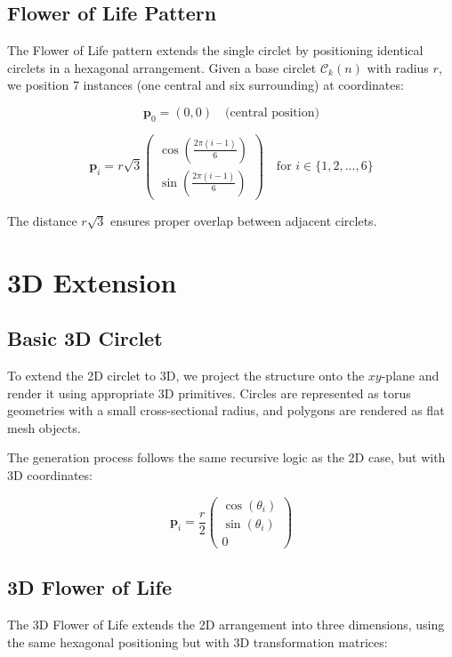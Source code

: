 \documentclass[12pt,a4paper]{article}
\begin{document}
\subsection{Flower of Life Pattern}
The Flower of Life pattern extends the single circlet by positioning identical circlets in a hexagonal arrangement. Given a base circlet $\mathcal{C}_k(n)$ with radius $r$, we position 7 instances (one central and six surrounding) at coordinates:

\begin{equation}
\mathbf{p}_0 = (0, 0) \quad \text{(central position)}
\end{equation}

\begin{equation}
\mathbf{p}_i = r\sqrt{3} \begin{pmatrix} \cos(\frac{2\pi(i-1)}{6}) \\ \sin(\frac{2\pi(i-1)}{6}) \end{pmatrix} \quad \text{for } i \in \{1, 2, ..., 6\}
\end{equation}

The distance $r\sqrt{3}$ ensures proper overlap between adjacent circlets.

\section{3D Extension}

\subsection{Basic 3D Circlet}
To extend the 2D circlet to 3D, we project the structure onto the $xy$-plane and render it using appropriate 3D primitives. Circles are represented as torus geometries with a small cross-sectional radius, and polygons are rendered as flat mesh objects.

The generation process follows the same recursive logic as the 2D case, but with 3D coordinates:

\begin{equation}
\mathbf{p}_i = \frac{r}{2} \begin{pmatrix} \cos(\theta_i) \\ \sin(\theta_i) \\ 0 \end{pmatrix}
\end{equation}

\subsection{3D Flower of Life}
The 3D Flower of Life extends the 2D arrangement into three dimensions, using the same hexagonal positioning but with 3D transformation matrices:
\end{document}
